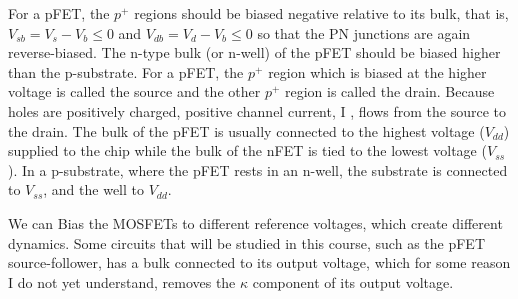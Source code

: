 For a pFET, the $p^+$ regions should be biased negative relative to its bulk, that is, $V_{sb} = V_s - V_b \leq  0$ and $V_{db} = V_d - V_b \leq  0$ so that the PN junctions are again reverse-biased. The n-type bulk (or n-well) of the pFET should be
biased higher than the p-substrate. For a pFET, the $p^+$ region which is biased at the higher voltage is called the source and the other $p^+$ region is called the
drain. Because holes are positively charged, positive channel current, I , flows from the source to the drain. The bulk of the pFET is usually connected to the highest voltage ($V_{dd}$) supplied to the chip while the bulk of the nFET is tied to the lowest voltage ($V_{ss}$). In a p-substrate, where the pFET rests in an n-well, the substrate is connected to $V_{ss}$,
and the well to $V_{dd}$.

We can Bias the MOSFETs to different reference voltages, which create different dynamics. Some circuits that will be studied in this course, such as the pFET source-follower, has a bulk connected to its output voltage, which for some reason I do not yet understand, removes the $\kappa$ component of its output voltage. 